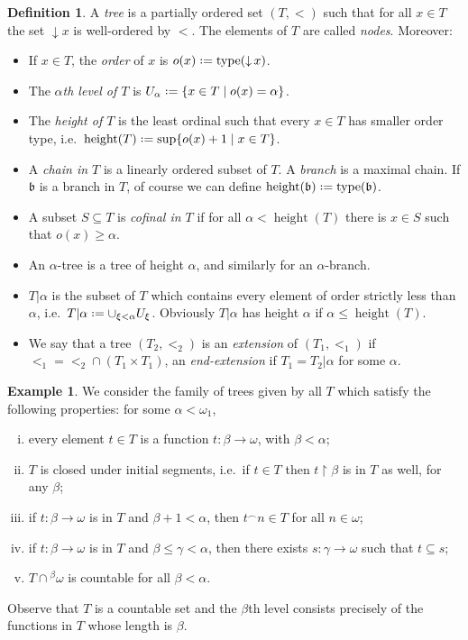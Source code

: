 \documentclass[11pt,a4paper]{report}
\theoremstyle{definition}
\newtheorem{defn}[theorem]{Definition}
\newtheorem{example}[theorem]{Example}
\theoremstyle{num.custom-title}
\theoremstyle{custom-title}
\DeclareMathOperator{\sse}{\subseteq}
\DeclareMathOperator{\type}{type}
\DeclareMathOperator{\height}{height}
\DeclareMathOperator{\restr}{\upharpoonright}
\DeclareMathOperator{\down}{\downarrow}
\newcommand{\conc}{^\frown}
\newcommand*{\defeq}{\mathrel{\rlap{%
                     \raisebox{0.3ex}{$\cdot$}}%
                     \raisebox{-0.3ex}{$\cdot$}}%
                     =}
\begin{document}
\begin{defn}
A \emph{tree} is a partially ordered set $(T,<)$ such that for all $x \in T$ the set $\down x$ is well-ordered by $<$. The elements of $T$ are called \emph{nodes}. Moreover:
\begin{itemize}
\item If $x \in T$, the \emph{order} of $x$ is $o(x) \defeq \type(\down x)$.
\item The \emph{$\alpha$th level of $T$} is $U_\alpha \defeq \{x \in T \mid o(x)=\alpha\}$.
\item The \emph{height of $T$} is the least ordinal such that every $x \in T$ has smaller order type, i.e.\ $\height(T) \defeq \sup\{o(x)+1 \mid x \in T\}$.
\item A \emph{chain in $T$} is a linearly ordered subset of $T$. A \emph{branch} is a maximal chain. If $\mathfrak{b}$ is a branch in $T$, of course we can define $\height(\mathfrak{b}) \defeq \type(\mathfrak{b})$.
\item A subset $S \sse T$ is \emph{cofinal in $T$} if for all $\alpha < \height(T)$ there is $x \in S$ such that $o(x) \geq \alpha$.
\item An $\alpha$-tree is a tree of height $\alpha$, and similarly for an $\alpha$-branch.
\item $T|\alpha$ is the subset of $T$ which contains every element of order strictly less than $\alpha$, i.e.\ $T|\alpha \defeq \cup_{\xi < \alpha} U_\xi$. Obviously $T|\alpha$ has height $\alpha$ if $\alpha \leq \height(T)$.
\item We say that a tree $(T_2,<_2)$ is an \emph{extension} of $(T_1,<_1)$ if ${<_1} = {<_2} \cap (T_1 \times T_1)$, an \emph{end-extension} if $T_1=T_2|\alpha$ for some $\alpha$.
\end{itemize}
\end{defn}

\begin{example}\label{example-countable_normal_trees}
We consider the family of trees given by all $T$ which satisfy the following properties: for some $\alpha < \omega_1$,
\begin{enumerate}[(i)]
\item every element $t \in T$ is a function $t \colon \beta \to \omega$, with $\beta < \alpha$;
\item $T$ is closed under initial segments, i.e.\ if $t \in T$ then $t \restr \beta$ is in $T$ as well, for any $\beta$;
\item if $t \colon \beta \to \omega$ is in $T$ and $\beta+1 < \alpha$, then $t \conc n \in T$ for all $n \in \omega$;
\item if $t \colon \beta \to \omega$ is in $T$ and $\beta \leq \gamma < \alpha$, then there exists $s \colon \gamma \to \omega$ such that $t \sse s$;
\item $T \cap {}^{\beta} \omega$ is countable for all $\beta < \alpha$.
\end{enumerate}
Observe that $T$ is a countable set and the $\beta$th level consists precisely of the functions in $T$ whose length is $\beta$.
\end{example}
\end{document}
